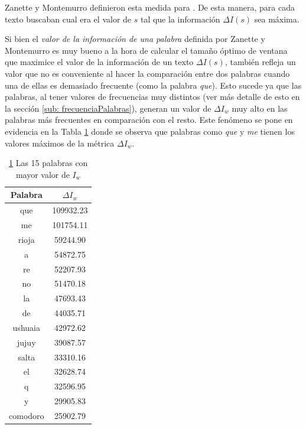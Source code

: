 Zanette y Montemurro definieron esta medida para . De esta manera, para cada texto buscaban cual era el valor de $s$ tal que la información $\Delta I(s)$ sea máxima.


Si bien el \textit{valor de la información de una palabra} definida por Zanette y Montemurro es muy bueno a la hora de calcular el tamaño óptimo de ventana que maximice el valor de la información de un texto $\Delta I(s)$, también refleja un valor que no es conveniente al hacer la comparación entre dos palabras cuando una de ellas es demasiado frecuente (como la palabra \textit{que}). Esto sucede ya que las palabras, al tener valores de frecuencias muy distintos (ver más detalle de esto en la sección \ref{sub: frecuenciaPalabras}), generan un valor de $\Delta I_w$ muy alto en las palabras más frecuentes en comparación con el resto. Este fenómeno se pone en evidencia en la Tabla \ref{tab:zanette} donde se observa que palabras como \textit{que} y \textit{me} tienen los valores máximos de la métrica $\Delta I_w$.



\begin{table}[ht]
\centering

\begin{tabular}{ c c }
\toprule
Palabra  & $\Delta I_w$                      \\
\midrule
que      & 109932.23                         \\
me       & 101754.11                        \\
rioja    & 59244.90                          \\
a        & 54872.75                          \\
re       & 52207.93                          \\
no       & 51470.18                          \\
la       & 47693.43                          \\
de       & 44035.71                          \\
ushuaia  & 42972.62                          \\
jujuy    & 39087.57                          \\
salta    & 33310.16                          \\
el       & 32628.74                          \\
q        & 32596.95                          \\
y        & 29905.83                          \\
comodoro & 25902.79                         \\
\bottomrule
\end{tabular}
\caption{\ref{tab:zanette} Las 15 palabras con mayor valor de $I_w$ }
\label{tab:zanette}
\end{table}

